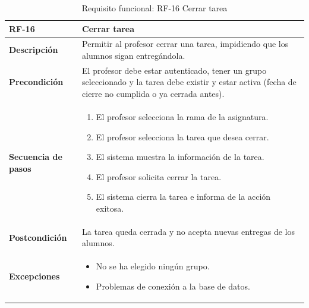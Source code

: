 \begin{table}[H]
\centering
\begin{tabularx}{\textwidth}{
  |>{\centering\arraybackslash}l
  |>{\centering\arraybackslash}X|}
\hline
\textbf{RF-16} & \textbf{Cerrar tarea} \\ \hline

\textbf{Descripción} & Permitir al profesor cerrar una tarea, impidiendo que los alumnos sigan entregándola. \\ \hline

\textbf{Precondición} & El profesor debe estar autenticado, tener un grupo seleccionado y la tarea debe existir y estar activa (fecha de cierre no cumplida o ya cerrada antes). \\ \hline

\textbf{Secuencia de pasos} & 
\begin{enumerate}
  \item El profesor selecciona la rama de la asignatura.
  \item El profesor selecciona la tarea que desea cerrar.
  \item El sistema muestra la información de la tarea.
  \item El profesor solicita cerrar la tarea.
  \item El sistema cierra la tarea e informa de la acción exitosa.
\end{enumerate} \\ \hline

\textbf{Postcondición} & La tarea queda cerrada y no acepta nuevas entregas de los alumnos. \\ \hline

\textbf{Excepciones} & 
\begin{itemize}
  \item No se ha elegido ningún grupo.
  \item Problemas de conexión a la base de datos.
\end{itemize} \\ \hline
\end{tabularx}
\caption{Requisito funcional: RF-16 Cerrar tarea}
\end{table}


